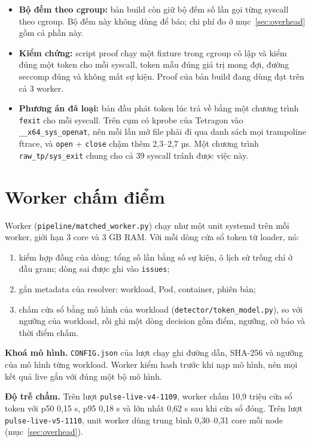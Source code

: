 \begin{itemize}
\item
  \textbf{Bộ đếm theo cgroup:} bản build còn giữ bộ đếm số lần gọi từng syscall theo cgroup. Bộ đếm này không dùng để báo; chi phí đo ở mục~\ref{sec:overhead} gồm cả phần này.
\item
  \textbf{Kiểm chứng:} script proof chạy một fixture trong cgroup cô lập và kiểm đúng một token cho mỗi syscall, token mẫu đúng giá trị mong đợi, đường seccomp đúng và không mất sự kiện. Proof của bản build đang dùng đạt trên cả 3 worker.
\item
  \textbf{Phương án đã loại:} bản đầu phát token lúc trả về bằng một chương trình \texttt{fexit} cho mỗi syscall. Trên cụm có kprobe của Tetragon vào \texttt{\_\_x64\_sys\_openat}, nên mỗi lần mở file phải đi qua danh sách mọi trampoline ftrace, và \texttt{open} + \texttt{close} chậm thêm 2,3--2,7 µs. Một chương trình \texttt{raw\_tp/sys\_exit} chung cho cả 39 syscall tránh được việc này.
\end{itemize}

\section{Worker chấm điểm}

Worker (\texttt{pipeline/\allowbreak{}matched\_\allowbreak{}worker.\allowbreak{}py}) chạy như một unit systemd trên mỗi worker, giới hạn 3 core và 3 GB RAM. Với mỗi dòng cửa sổ token từ loader, nó:

\begin{enumerate}
\def\labelenumi{\arabic{enumi}.}
\tightlist
\item
  kiểm hợp đồng của dòng: tổng số lần bằng số sự kiện, ô lịch sử trống chỉ ở đầu gram; dòng sai được ghi vào \texttt{issues};
\item
  gắn metadata của resolver: workload, Pod, container, phiên bản;
\item
  chấm cửa sổ bằng mô hình của workload (\texttt{detector/\allowbreak{}token\_\allowbreak{}model.\allowbreak{}py}), so với ngưỡng của workload, rồi ghi một dòng decision gồm điểm, ngưỡng, cờ báo và thời điểm chấm.
\end{enumerate}

\textbf{Khoá mô hình.} \texttt{CONFIG.json} của lượt chạy ghi đường dẫn, SHA-256 và ngưỡng của mô hình từng workload. Worker kiểm hash trước khi nạp mô hình, nên mọi kết quả live gắn với đúng một bộ mô hình.

\textbf{Độ trễ chấm.} Trên lượt \texttt{pulse-\allowbreak{}live-\allowbreak{}v4-\allowbreak{}1109}, worker chấm 10,9 triệu cửa sổ token với p50 0,15 s, p95 0,18 s và lớn nhất 0,62 s sau khi cửa sổ đóng. Trên lượt \texttt{pulse-\allowbreak{}live-\allowbreak{}v5-\allowbreak{}1110}, unit worker dùng trung bình 0,30--0,31 core mỗi node (mục~\ref{sec:overhead}).

